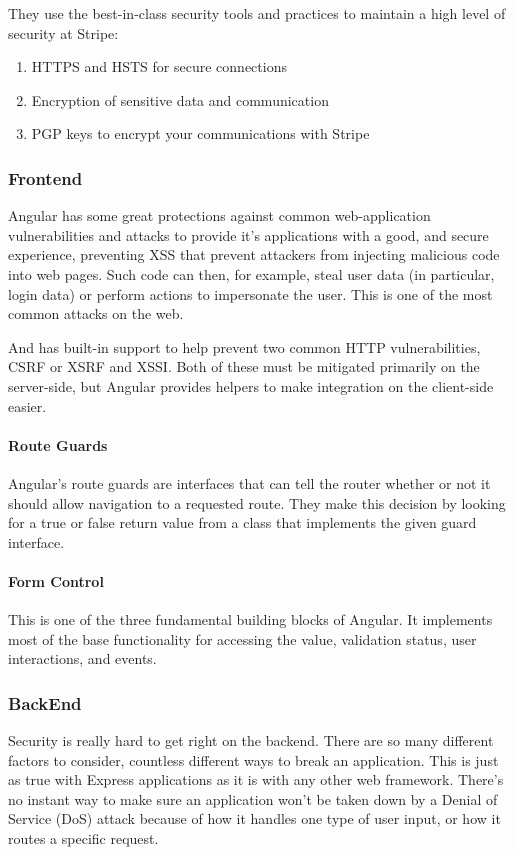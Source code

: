 They use the best-in-class security tools and practices to maintain a high level of security at Stripe:
\begin{enumerate}
      \item HTTPS and HSTS for secure connections
      \item Encryption of sensitive data and communication
      \item PGP keys to encrypt your communications with Stripe
\end{enumerate}
\subsubsection{Frontend}
Angular has some great protections against common web-application vulnerabilities and attacks to provide it's applications with a good, and secure experience, preventing \ac{XSS} that prevent attackers from injecting malicious code into web pages. Such code can then, for example, steal user data (in particular, login data) or perform actions to impersonate the user. This is one of the most common attacks on the web.

And has built-in support to help prevent two common HTTP vulnerabilities, \ac{CSRF} or XSRF and \ac{XSSI}. Both of these must be mitigated primarily on the server-side, but Angular provides helpers to make integration on the client-side easier.

\paragraph*{Route Guards}
Angular’s route guards are interfaces that can tell the router whether or not it should allow navigation to a requested route. They make this decision by looking for a true or false return value from a class that implements the given guard interface.
\paragraph*{Form Control}
This is one of the three fundamental building blocks of Angular. It implements most of the base functionality for accessing the value, validation status, user interactions, and events.
\subsubsection{BackEnd}
Security is really hard to get right on the backend. There are so many different factors to consider, countless different ways to break an application. 
This is just as true with Express applications as it is with any other web framework. There's no instant way to make sure an application won't be taken down by a Denial of Service (DoS) attack because of how it handles one type of user input, or how it routes a specific request.
